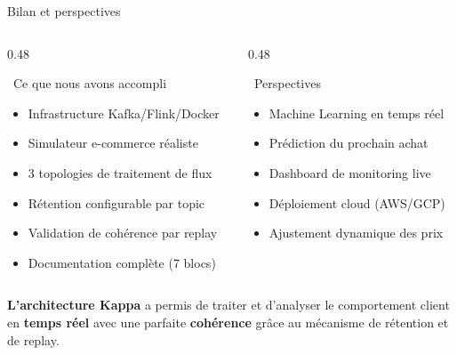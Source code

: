 \documentclass[aspectratio=169, 12pt]{beamer}
\begin{document}
\begin{frame}{Bilan et perspectives}
  \begin{columns}[T]
    \begin{column}{0.48\textwidth}
      \begin{exampleblock}{\faCheckCircle\ Ce que nous avons accompli}
        \small
        \begin{itemize}
          \item Infrastructure Kafka/Flink/Docker
          \item Simulateur e-commerce réaliste
          \item 3 topologies de traitement de flux
          \item Rétention configurable par topic
          \item Validation de cohérence par replay
          \item Documentation complète (7 blocs)
        \end{itemize}
      \end{exampleblock}
    \end{column}
    \begin{column}{0.48\textwidth}
      \begin{block}{\faRocket\ Perspectives}
        \small
        \begin{itemize}
          \item Machine Learning en temps réel
          \item Prédiction du prochain achat
          \item Dashboard de monitoring live
          \item Déploiement cloud (AWS/GCP)
          \item Ajustement dynamique des prix
        \end{itemize}
      \end{block}
    \end{column}
  \end{columns}

  \vspace{0.5cm}
  \begin{block}{}
    \centering
    \textbf{L'architecture Kappa} a permis de traiter et d'analyser le comportement client en \textbf{temps réel} avec une parfaite \textbf{cohérence} grâce au mécanisme de rétention et de replay.
  \end{block}
\end{frame}
\end{document}
